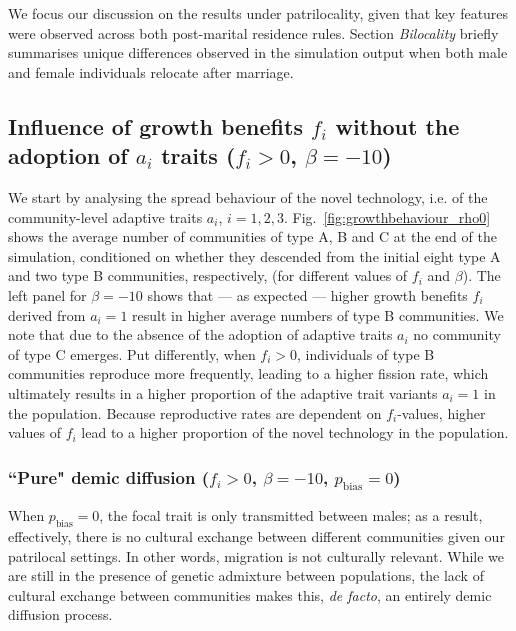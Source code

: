 \documentclass[9pt,twocolumn,twoside,lineno]{pnas-new}
\begin{document}
We focus our discussion on the results under patrilocality, given that key features were observed across both post-marital residence rules. Section \textit{Bilocality} briefly summarises unique differences observed in the simulation output when both male and female individuals relocate after marriage.


\subsection*{Influence of growth benefits $f_i$ without the adoption of $a_i$ traits ($f_i>0$, $\beta=-10$)}

We start by analysing the spread behaviour of the novel technology, i.e. of the community-level adaptive traits $a_i$, $i=1,2,3$. 
Fig.~\ref{fig:growthbehaviour_rho0} shows the average number of communities of type A, B and C at the end of the simulation, conditioned on whether they descended from the initial eight type A and two type B communities, respectively, (for different values of $f_i$ and $\beta$). The left panel for $\beta=-10$ shows that --- as expected --- higher growth benefits $f_i$ derived from $a_i=1$ result in higher average numbers of type B communities. We note that due to the absence of the adoption of adaptive traits $a_i$ no community of type C emerges. 
Put differently, when $f_i>0$, individuals of type B communities reproduce more frequently, leading to a higher fission rate, which ultimately results in a higher proportion of the adaptive trait variants $a_i=1$ in the population. Because reproductive rates are dependent on $f_i$-values, higher values of $f_i$ lead to a higher proportion of the novel technology in the population. 

\subsubsection*{``Pure" demic diffusion ($f_i>0$, $\beta=-10$, $p_\text{bias}=0$)}

When $p_\text{bias}=0$, the focal trait is only transmitted between males; as a result, effectively, there is no cultural exchange between different communities given our patrilocal settings. In other words, migration is not culturally relevant. While we are still in the presence of genetic admixture between populations, the lack of cultural exchange between communities makes this, \textit{de facto}, an entirely demic diffusion process. 
\end{document}
